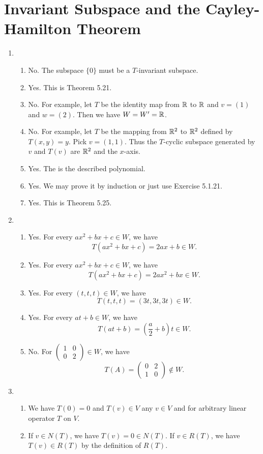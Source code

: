 \section{Invariant Subspace and the Cayley-Hamilton Theorem}
\begin{enumerate}
\item \begin{enumerate}
\item No. The subspace $\{0\}$ must be a $T$-invariant subspace.
\item Yes. This is Theorem 5.21.
\item No. For example, let $T$ be the identity map from $\mathbb{R}$ to $\mathbb{R}$ and $v=(1)$ and $w=(2)$. Then we have $W=W'=\mathbb{R}$.
\item No. For example, let $T$ be the mapping from $\mathbb{R}^2$ to $\mathbb{R}^2$ defined by $T(x,y)=y$. Pick $v=(1,1)$. Thus the $T$-cyclic subspace generated by $v$ and $T(v)$ are $\mathbb{R}^2$ and the $x$-axis.
\item Yes. The \charpoly{} is the described polynomial.
\item Yes. We may prove it by induction or just use Exercise 5.1.21.
\item Yes. This is Theorem 5.25.
\end{enumerate}
\item \begin{enumerate}
\item Yes. For every $ax^2+bx+c\in W$, we have 
\[T(ax^2+bx+c)=2ax+b\in W.\]
\item Yes. For every $ax^2+bx+c\in W$, we have 
\[T(ax^2+bx+c)=2ax^2+bx\in W.\]
\item Yes. For every $(t,t,t)\in W$, we have 
\[T(t,t,t)=(3t,3t,3t)\in W.\]
\item Yes. For every $at+b\in W$, we have 
\[T(at+b)=(\frac{a}{2}+b)t\in W.\]
\item No. For $\begin{pmatrix}1&0\\0&2\end{pmatrix}\in W$, we have
\[T(A)=\begin{pmatrix}0&2\\1&0\end{pmatrix}\notin W.\]
\end{enumerate}
\item \begin{enumerate}
\item We have $T(0)=0$ and $T(v)\in V$ any $v\in V$ and for arbitrary linear operator $T$ on $V$.
\item If $v\in N(T)$, we have $T(v)=0\in N(T)$. If $v\in R(T)$, we have $T(v)\in R(T)$ by the definition of $R(T)$.

\end{enumerate}
\end{enumerate}

